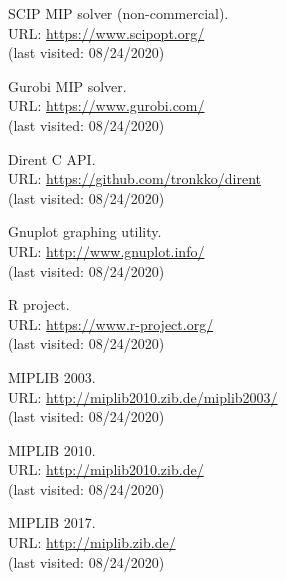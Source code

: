 \documentclass[a4paper,12pt,twoside]{scrbook}
\begin{document}
\begin{thebibliography}{9}
	 SCIP MIP solver (non-commercial). \\ URL: \url{https://www.scipopt.org/} \\ (last visited: 08/24/2020)

	 Gurobi MIP solver. \\ URL: \url{https://www.gurobi.com/} \\ (last visited: 08/24/2020)

	 Dirent C API. \\ URL: \url{https://github.com/tronkko/dirent} \\ (last visited: 08/24/2020)

	 Gnuplot graphing utility. \\ URL: \url{http://www.gnuplot.info/} \\ (last visited: 08/24/2020)

	 R project. \\ URL: \url{https://www.r-project.org/} \\ (last visited: 08/24/2020)

	 MIPLIB 2003. \\ URL: \url{http://miplib2010.zib.de/miplib2003/} \\ (last visited: 08/24/2020)

	 MIPLIB 2010. \\ URL: \url{http://miplib2010.zib.de/} \\ (last visited: 08/24/2020)

	 MIPLIB 2017. \\ URL: \url{http://miplib.zib.de/} \\ (last visited: 08/24/2020)
	
\end{thebibliography}
\end{document}
